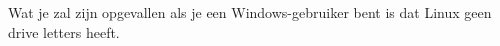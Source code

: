 Wat je zal zijn opgevallen als je een Windows-gebruiker bent is dat Linux geen drive letters heeft.

